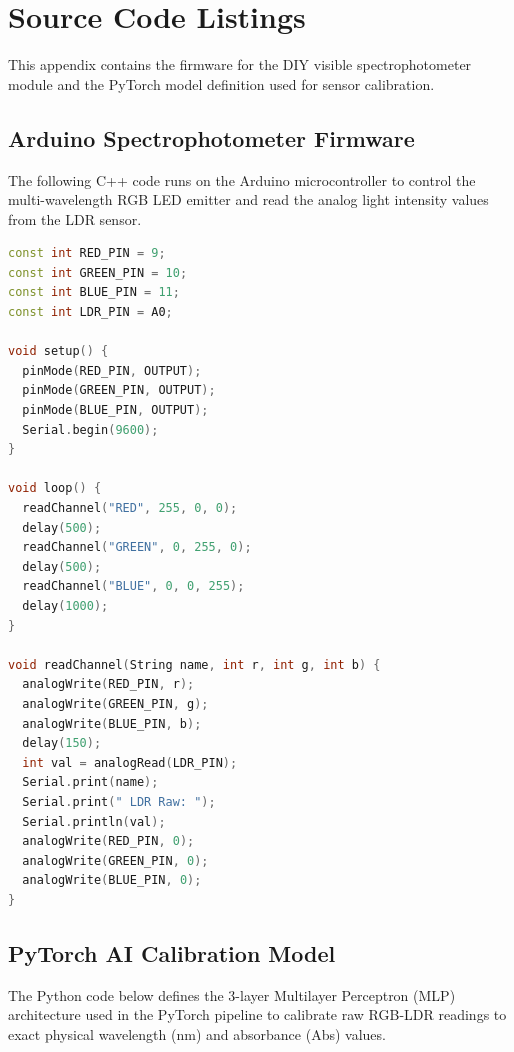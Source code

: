 \chapter{Source Code Listings}

This appendix contains the firmware for the DIY visible spectrophotometer module and the PyTorch model definition used for sensor calibration.


\section{Arduino Spectrophotometer Firmware}
The following C++ code runs on the Arduino microcontroller to control the multi-wavelength RGB LED emitter and read the analog light intensity values from the LDR sensor.

\begin{tcolorbox}[colback=gray!5,colframe=gray!30,title=Arduino firmware (C++),breakable]
\begin{lstlisting}[language=C++]
const int RED_PIN = 9;
const int GREEN_PIN = 10;
const int BLUE_PIN = 11;
const int LDR_PIN = A0;

void setup() {
  pinMode(RED_PIN, OUTPUT);
  pinMode(GREEN_PIN, OUTPUT);
  pinMode(BLUE_PIN, OUTPUT);
  Serial.begin(9600);
}

void loop() {
  readChannel("RED", 255, 0, 0);
  delay(500);
  readChannel("GREEN", 0, 255, 0);
  delay(500);
  readChannel("BLUE", 0, 0, 255);
  delay(1000);
}

void readChannel(String name, int r, int g, int b) {
  analogWrite(RED_PIN, r);
  analogWrite(GREEN_PIN, g);
  analogWrite(BLUE_PIN, b);
  delay(150);
  int val = analogRead(LDR_PIN);
  Serial.print(name);
  Serial.print(" LDR Raw: ");
  Serial.println(val);
  analogWrite(RED_PIN, 0);
  analogWrite(GREEN_PIN, 0);
  analogWrite(BLUE_PIN, 0);
}
\end{lstlisting}
\end{tcolorbox}

\newpage
\section{PyTorch AI Calibration Model}
The Python code below defines the 3-layer Multilayer Perceptron (MLP) architecture used in the PyTorch pipeline to calibrate raw RGB-LDR readings to exact physical wavelength (nm) and absorbance (Abs) values.

